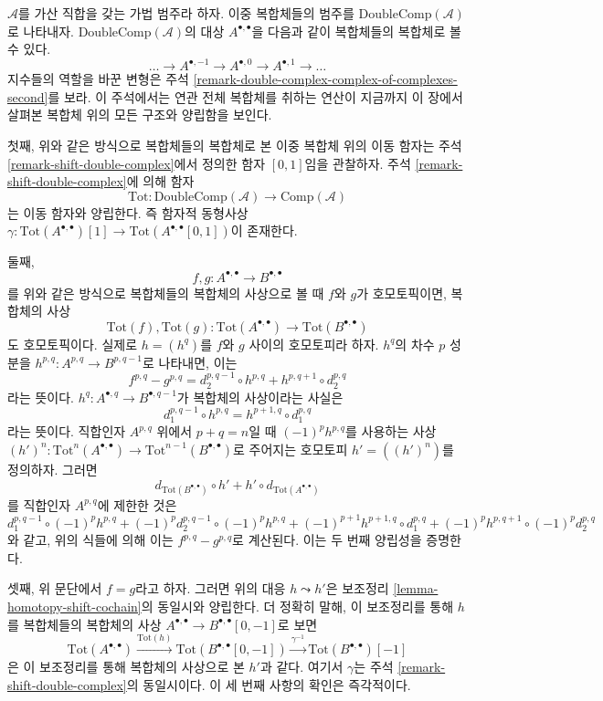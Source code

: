 \begin{remark}
\label{remark-double-complex-complex-of-complexes-first}
$\mathcal{A}$를 가산 직합을 갖는 가법 범주라 하자.
이중 복합체들의 범주를 $\text{DoubleComp}(\mathcal{A})$로 나타내자.
$\text{DoubleComp}(\mathcal{A})$의 대상 $A^{\bullet, \bullet}$을
다음과 같이 복합체들의 복합체로 볼 수 있다.
$$
\ldots \to A^{\bullet, -1} \to A^{\bullet, 0} \to A^{\bullet, 1} \to \ldots
$$
지수들의 역할을 바꾼 변형은 주석
\ref{remark-double-complex-complex-of-complexes-second}를 보라.
이 주석에서는 연관 전체 복합체를 취하는 연산이 지금까지 이 장에서
살펴본 복합체 위의 모든 구조와 양립함을 보인다.

\medskip\noindent
첫째, 위와 같은 방식으로 복합체들의 복합체로 본 이중 복합체 위의
이동 함자는 주석 \ref{remark-shift-double-complex}에서 정의한 함자
$[0, 1]$임을 관찰하자. 주석 \ref{remark-shift-double-complex}에 의해
함자
$$
\text{Tot} : \text{DoubleComp}(\mathcal{A}) \to \text{Comp}(\mathcal{A})
$$
는 이동 함자와 양립한다. 즉 함자적 동형사상
$\gamma : \text{Tot}(A^{\bullet, \bullet})[1] \to
\text{Tot}(A^{\bullet, \bullet}[0, 1])$이 존재한다.

\medskip\noindent
둘째,
$$
f, g : A^{\bullet, \bullet} \to B^{\bullet, \bullet}
$$
를 위와 같은 방식으로 복합체들의 복합체의 사상으로 볼 때
$f$와 $g$가 호모토픽이면, 복합체의 사상
$$
\text{Tot}(f), \text{Tot}(g) :
\text{Tot}(A^{\bullet, \bullet}) \to \text{Tot}(B^{\bullet, \bullet})
$$
도 호모토픽이다. 실제로 $h = (h^q)$를 $f$와 $g$ 사이의 호모토피라
하자. $h^q$의 차수 $p$ 성분을
$h^{p, q} : A^{p, q} \to B^{p, q - 1}$로 나타내면, 이는
$$
f^{p, q} - g^{p, q} = d_2^{p, q - 1} \circ h^{p, q} +
h^{p, q + 1} \circ d_2^{p, q}
$$
라는 뜻이다. $h^q : A^{\bullet, q} \to B^{\bullet, q - 1}$가 복합체의
사상이라는 사실은
$$
d_1^{p, q - 1} \circ h^{p, q} = h^{p + 1, q} \circ d_1^{p, q}
$$
라는 뜻이다. 직합인자 $A^{p, q}$ 위에서 $p + q = n$일 때
$(-1)^ph^{p, q}$를 사용하는 사상
$(h')^n : \text{Tot}^n(A^{\bullet, \bullet}) \to
\text{Tot}^{n - 1}(B^{\bullet, \bullet})$로 주어지는 호모토피
$h' = ((h')^n)$를 정의하자. 그러면
$$
d_{\text{Tot}(B^{\bullet, \bullet})} \circ h' +
h' \circ d_{\text{Tot}(A^{\bullet, \bullet})}
$$
를 직합인자 $A^{p, q}$에 제한한 것은
$$
d_1^{p, q - 1} \circ (-1)^p h^{p, q} +
(-1)^p d_2^{p, q - 1} \circ (-1)^p h^{p, q} +
(-1)^{p + 1} h^{p + 1, q} \circ d_1^{p, q} +
(-1)^p h^{p, q + 1} \circ (-1)^p d_2^{p, q}
$$
와 같고, 위의 식들에 의해 이는 $f^{p, q} - g^{p, q}$로 계산된다.
이는 두 번째 양립성을 증명한다.

\medskip\noindent
셋째, 위 문단에서 $f = g$라고 하자. 그러면 위의 대응
$h \leadsto h'$은 보조정리 \ref{lemma-homotopy-shift-cochain}의
동일시와 양립한다. 더 정확히 말해, 이 보조정리를 통해 $h$를
복합체들의 복합체의 사상
$A^{\bullet, \bullet} \to B^{\bullet, \bullet}[0, -1]$로 보면
$$
\text{Tot}(A^{\bullet, \bullet})
\xrightarrow{\text{Tot}(h)}
\text{Tot}(B^{\bullet, \bullet}[0, -1])
\xrightarrow{\gamma^{-1}}
\text{Tot}(B^{\bullet, \bullet})[-1]
$$
은 이 보조정리를 통해 복합체의 사상으로 본 $h'$과 같다.
여기서 $\gamma$는 주석 \ref{remark-shift-double-complex}의
동일시이다. 이 세 번째 사항의 확인은 즉각적이다.


\end{remark}
